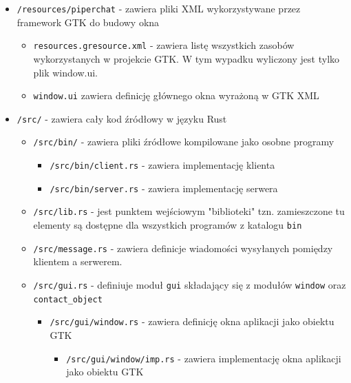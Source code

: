 \begin{itemize}
    \item \verb|/resources/piperchat| - zawiera pliki XML wykorzystywane przez framework GTK do
          budowy okna
          \begin{itemize}
              \item \verb|resources.gresource.xml| - zawiera listę wszystkich zasobów wykorzystanych w
                    projekcie GTK. W tym wypadku wyliczony jest tylko plik window.ui.
              \item \verb|window.ui| zawiera definicję głównego okna wyrażoną w GTK XML
          \end{itemize}

    \item \verb|/src/| - zawiera cały kod źródłowy w języku Rust
          \begin{itemize}
              \item \verb|/src/bin/| - zawiera pliki źródłowe kompilowane jako osobne programy
                    \begin{itemize}
                        \item \verb|/src/bin/client.rs| - zawiera implementację klienta
                        \item \verb|/src/bin/server.rs| - zawiera implementację serwera
                    \end{itemize}
              \item \verb|/src/lib.rs| - jest punktem wejściowym "biblioteki" tzn. zamieszczone tu
                    elementy są dostępne dla wszystkich programów z katalogu \verb|bin|
              \item \verb|/src/message.rs| - zawiera definicje wiadomości wysyłanych pomiędzy klientem a serwerem.
              \item \verb|/src/gui.rs| - definiuje moduł \verb|gui| składający się z modułów
                    \verb|window| oraz \verb|contact_object|
                    \begin{itemize}
                        \item \verb|/src/gui/window.rs| - zawiera definicję okna aplikacji jako obiektu GTK
                              \begin{itemize}
                                  \item \verb|/src/gui/window/imp.rs| - zawiera implementację okna aplikacji jako
                                        obiektu GTK
                              \end{itemize}

\end{itemize}
\end{itemize}
\end{itemize}
